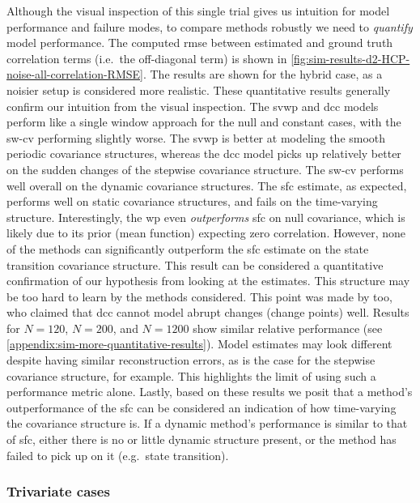 Although the visual inspection of this single trial gives us intuition for model performance and failure modes, to compare methods robustly we need to \emph{quantify} model performance.
The computed \gls{rmse} between estimated and ground truth correlation terms (i.e.~the off-diagonal term) is shown in \cref{fig:sim-results-d2-HCP-noise-all-correlation-RMSE}.
The results are shown for the hybrid case, as a noisier setup is considered more realistic.
%
These quantitative results generally confirm our intuition from the visual inspection.
The \gls{svwp} and \gls{dcc} models perform like a single window approach for the null and constant cases, with the \gls{sw-cv} performing slightly worse.
The \gls{svwp} is better at modeling the smooth periodic covariance structures, whereas the \gls{dcc} model picks up relatively better on the sudden changes of the stepwise covariance structure.
The \gls{sw-cv} performs well overall on the dynamic covariance structures.
The \gls{sfc} estimate, as expected, performs well on static covariance structures, and fails on the time-varying structure.
Interestingly, the \gls{wp} even \emph{outperforms} \gls{sfc} on null covariance, which is likely due to its prior (mean function) expecting zero correlation.
%
However, none of the methods can significantly outperform the \gls{sfc} estimate on the state transition covariance structure.
This result can be considered a quantitative confirmation of our hypothesis from looking at the estimates.
This structure may be too hard to learn by the methods considered.
This point was made by \textcite{Lindquist2014} too, who claimed that \gls{dcc} cannot model abrupt changes (change points) well.
Results for $N = 120$, $N = 200$, and $N = 1200$ show similar relative performance (see \cref{appendix:sim-more-quantitative-results}).
%
Model estimates may look different despite having similar reconstruction errors, as is the case for the stepwise covariance structure, for example.
This highlights the limit of using such a performance metric alone.
%
Lastly, based on these results we posit that a method's outperformance of the \gls{sfc} can be considered an indication of how time-varying the covariance structure is.
If a dynamic method's performance is similar to that of \gls{sfc}, either there is no or little dynamic structure present, or the method has failed to pick up on it (e.g.~state transition).

\subsubsection{Trivariate cases}

